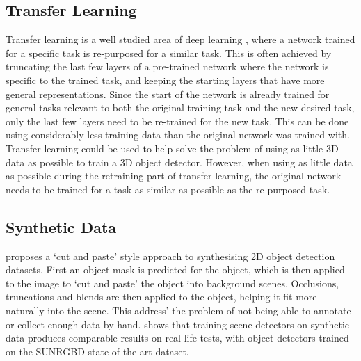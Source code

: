 \documentclass[11pt]{article}
\begin{document}
\subsection*{Transfer Learning}
Transfer learning is a well studied area of deep learning \cite{DeCAF}\cite{survery_on_transfer}\cite{how_transferable}, where a network trained for a specific task is re-purposed for a similar task. This is often achieved by truncating the last few layers of a pre-trained network where the network is specific to the trained task, and keeping the starting layers that have more general representations. Since the start of the network is already trained for general tasks relevant to both the original training task and the new desired task, only the last few layers need to be re-trained for the new task. This can be done using considerably less training data than the original network was trained with. Transfer learning could be used to help solve the problem of using as little 3D data as possible to train a 3D object detector. However, when using as little data as possible during the retraining part of transfer learning, the original network needs to be trained for a task as similar as possible as the re-purposed task.

\subsection*{Synthetic Data}
\cite{cut_paste} proposes a `cut and paste' style approach to synthesising 2D object detection datasets. First an object mask is predicted for the object, which is then applied to the image to `cut and paste' the object into background scenes. Occlusions, truncations and blends are then applied to the object, helping it fit more naturally into the scene. This address' the problem of not being able to annotate or collect enough data by hand. \cite{synthetic_train} shows that training scene detectors on synthetic data produces comparable results on real life tests, with object detectors trained on the SUNRGBD state of the art dataset.
\end{document}
